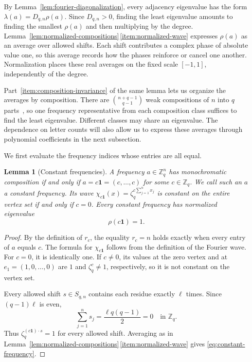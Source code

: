 \documentclass[11pt,a4paper]{article}
\numberwithin{equation}{section}
\numberwithin{figure}{section}
\numberwithin{table}{section}
\numberwithin{footnote}{section}
\newtheorem{lemma}[theorem]{Lemma}
\theoremstyle{informal}\newtheorem*{informaltheorem}{Informal theorem}
\theoremstyle{definition}\newtheorem{example}{Example}[section]
\theoremstyle{remark}\newtheorem{remark}[theorem]{Remark}
\newcommand{\Z}{\mathbb Z}
\newcommand{\one}{\mathbf 1}
\begin{document}
By Lemma~\ref{lem:fourier-diagonalization}, every adjacency
eigenvalue has the form \(\lambda(a)=D_{q,n}\rho(a)\). Since
\(D_{q,n}>0\), finding the least eigenvalue amounts to finding
the smallest \(\rho(a)\) and then multiplying by the degree.
Lemma~\ref{lem:normalized-compositions}\,\ref{item:normalized-wave}
expresses \(\rho(a)\) as an average over allowed shifts. Each
shift contributes a complex phase of absolute value one, so this
average records how the phases reinforce or cancel one another.
Normalization places these real averages on the fixed scale
\([-1,1]\), independently of the degree.

Part~\ref{item:composition-invariance} of the same lemma lets us
organize the averages by composition. There are
\(\binom{n+q-1}{q-1}\) weak compositions of \(n\) into \(q\)
parts~\cite[Sec.~1.2]{stanley}, so one frequency representative
from each composition class suffices to find the least eigenvalue.
Different classes may share an eigenvalue. The dependence on letter
counts will also allow us to express these averages through
polynomial coefficients in the next subsection.

We first evaluate the frequency indices whose entries are all equal.

\begin{lemma}[Constant frequencies]\label{lem:constant-frequencies}
A frequency \(a\in\Z_q^n\) has monochromatic composition if and
only if \(a=c\one=(c,\ldots,c)\) for some \(c\in\Z_q\).
We call such an \(a\) a \emph{constant frequency}. Its wave
\(\chi_{c\one}(x)=\zeta_q^{c\sum_{j=1}^n x_j}\) is constant
on the entire vertex set if and only if \(c=0\).
Every constant frequency has normalized eigenvalue
\begin{equation}\label{eq:constant-frequency}
 \rho(c\one)=1.
\end{equation}
\end{lemma}
\begin{proof}
By the definition of \(r_c\), the equality \(r_c=n\) holds
exactly when every entry of \(a\) equals \(c\). The formula for
\(\chi_{c\one}\) follows from the definition of the Fourier wave.
For \(c=0\), it is identically one. If \(c\neq0\), its values
at the zero vertex and at \(e_1=(1,0,\ldots,0)\) are
\(1\) and \(\zeta_q^c\neq1\), respectively, so it is not
constant on the vertex set.

Every allowed shift \(s\in S_{q,n}\) contains each residue exactly
\(\ell\) times. Since \((q-1)\ell\) is even,
\begin{equation}
 \sum_{j=1}^n s_j=\frac{\ell q(q-1)}2=0\quad\text{in }\Z_q.
\end{equation}
Thus \(\zeta_q^{(c\one)\cdot s}=1\) for every allowed shift.
Averaging as in
Lemma~\ref{lem:normalized-compositions}\,\ref{item:normalized-wave}
gives \eqref{eq:constant-frequency}.
\end{proof}
\end{document}
